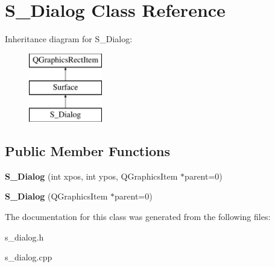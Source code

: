 \hypertarget{class_s___dialog}{}\section{S\+\_\+\+Dialog Class Reference}
\label{class_s___dialog}
Inheritance diagram for S\+\_\+\+Dialog\+:\begin{figure}[H]
\begin{center}
\leavevmode
\includegraphics[height=3.000000cm]{class_s___dialog}
\end{center}
\end{figure}
\subsection*{Public Member Functions}
\begin{DoxyCompactItemize}
\item 
\hypertarget{class_s___dialog_a9b20a59ab0954ef8d9befdfbb556e398}{}{\bfseries S\+\_\+\+Dialog} (int xpos, int ypos, Q\+Graphics\+Item $\ast$parent=0)\label{class_s___dialog_a9b20a59ab0954ef8d9befdfbb556e398}

\item 
\hypertarget{class_s___dialog_a1694750fe7501bc3cd20eb97e1e3384f}{}{\bfseries S\+\_\+\+Dialog} (Q\+Graphics\+Item $\ast$parent=0)\label{class_s___dialog_a1694750fe7501bc3cd20eb97e1e3384f}

\end{DoxyCompactItemize}


The documentation for this class was generated from the following files\+:\begin{DoxyCompactItemize}
\item 
s\+\_\+dialog.\+h\item 
s\+\_\+dialog.\+cpp\end{DoxyCompactItemize}
